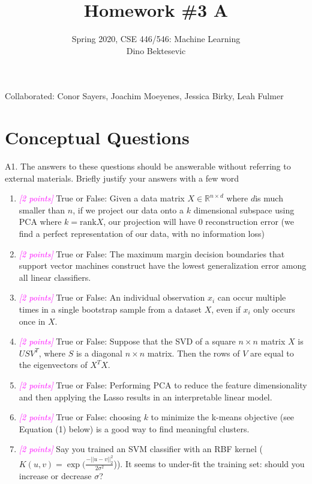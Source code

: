\documentclass{article}
\date{{}}
\newcommand{\field}[1]{\mathbb{#1}}
\newcommand{\1}{\mathbf{1}}
\newcommand{\R}{\field{R}} %
\newcommand{\points}[1]{\small\textcolor{magenta}{\emph{[#1 points]}} \normalsize}
\begin{document}
\title{Homework \#3 A}
\author{\normalsize{Spring 2020, CSE 446/546: Machine Learning}\\
\normalsize{Dino Bektesevic}}
\maketitle

Collaborated: Conor Sayers, Joachim Moeyenes, Jessica Birky, Leah Fulmer

\section*{Conceptual Questions}
A1. The answers to these questions should be answerable without referring to external materials.  Briefly justify your answers with a few word
\begin{enumerate}
\item \points{2} True or False: Given a data matrix $X\in \R^{n\times d}$ where $d$is much smaller than $n$, if we project our data onto a $k$ dimensional subspace using PCA where $k=\text{rank} X$, our projection will have 0 reconstruction error (we find a perfect representation of our data, with no information loss)

\item \points{2} True or False: The maximum margin decision boundaries that support vector machines construct have the lowest generalization error among all linear classifiers.

\item \points{2} True or False: An individual observation $x_i$ can occur multiple times in a single bootstrap sample from a dataset $X$, even if $x_i$ only occurs once in $X$.

\item \points{2} True or False: Suppose that the SVD of a square $n\times n$ matrix $X$ is $USV^T$, where $S$ is a diagonal $n\times n$ matrix. Then the rows of $V$ are equal to the eigenvectors of $X^TX$.

\item \points{2} True or False: Performing PCA to reduce the feature dimensionality and then applying the Lasso results in an interpretable linear model.

\item \points{2} True or False: choosing $k$ to minimize the k-means objective (see Equation (1) below) is a good way to find meaningful clusters.

\item \points{2} Say you trained an SVM classifier with an RBF kernel ($K(u,v) = \exp(\frac{-||u-v||^2_2}{ 2\sigma^2}$)). It seems to under-fit the training set: should you increase or decrease $\sigma$?
\end{enumerate}
\end{document}
